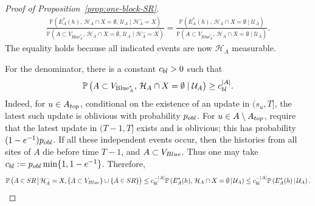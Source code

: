 \documentclass[10pt,a4paper]{amsart}
\begin{document}
\begin{proof}[Proof of Proposition~\ref{prop:one-block-SR}]
\begin{align*}
\frac{
\mathbb{P}\left(
E_A^*(h),\,
\mathcal{H}_{A}\cap  X=\emptyset,\,
\mathcal{U}_A
\mid \mathcal{H}_{A}^{-}= X
\right)
}{
\mathbb{P}\left(
A\subset V_{\mathrm{Blue}_{A}^{*}},\,
\mathcal{H}_{A}\cap X=\emptyset,\,
\mathcal{U}_A
\mid \mathcal{H}_{A}^{-}= X
\right)
}
=
\frac{
\mathbb{P}\left(
E_A^*(h),\,
\mathcal{H}_{A}\cap  X=\emptyset
\mid \mathcal{U}_A
\right)
}{
\mathbb{P}\left(
A\subset V_{\mathrm{Blue}_{A}^{*}},\,
\mathcal{H}_{A}\cap X=\emptyset
\mid \mathcal{U}_A
\right)
}
.
\end{align*}
The equality holds because all indicated events are now $\mathcal{H}_A$ measurable.




For the denominator, there is a constant
\(c_{\rm bl}>0\) such that
\[
\mathbb{P}\left(
A\subset V_{\mathrm{Blue}_{A}^{*}},\,
\mathcal{H}_{A}\cap X=\emptyset
\mid \mathcal{U}_A
\right)
        \ge
        c_{\rm bl}^{|A|}.
\]
Indeed, for \(u\in A_{\rm top}\), conditional on the existence of an update in
\((s_u,T]\), the latest such update is oblivious with probability
\(p_{\rm obl}\). For \(u\in A\setminus A_{\rm top}\), require that the latest
update in \((T-1,T]\) exists and is oblivious; this has probability
\((1-e^{-1})p_{\rm obl}\). If all these independent events occur, then the
histories from all sites of \(A\) die before time \(T-1\), and \(A\subset
V_{\rm Blue}\). Thus one may take $c_{\rm bl}:=p_{\rm obl}\min\{1,1-e^{-1}\}$. Therefore,
\begin{align*}
\mathbb P
\left(
    A\in{\rm SR}
    \,\middle|\,
    \mathcal H_A^-=X,
    \{A\subset V_{\rm Blue}\}\cup\{A\in{\rm SR}\}
\right)  
\leq
c_{\rm bl}^{-|A|}
        \mathbb P
        \left(
            E_A^*(h),\,
\mathcal{H}_{A}\cap  X=\emptyset
            \,\middle|\,
            \mathcal U_A
        \right)
\leq
c_{\rm bl}^{-|A|}
        \mathbb P
        \left(
            E_A^*(h)
            \,\middle|\,
            \mathcal U_A
        \right).
\end{align*}






\end{proof}
\end{document}
